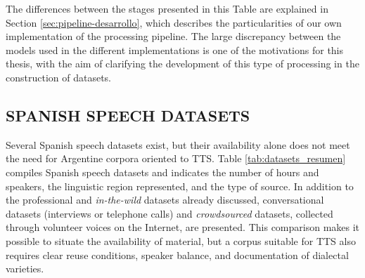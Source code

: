 The differences between the stages presented in this Table are explained in Section \ref{sec:pipeline-desarrollo}, which describes the particularities of our own implementation of the processing pipeline. The large discrepancy between the models used in the different implementations is one of the motivations for this thesis, with the aim of clarifying the development of this type of processing in the construction of datasets.

\subsection{SPANISH SPEECH DATASETS}
Several Spanish speech datasets exist, but their availability alone does not meet the need for Argentine corpora oriented to TTS. Table \ref{tab:datasets_resumen} compiles Spanish speech datasets and indicates the number of hours and speakers, the linguistic region represented, and the type of source. In addition to the professional and \emph{in-the-wild} datasets already discussed, conversational datasets (interviews or telephone calls) and \emph{crowdsourced} datasets, collected through volunteer voices on the Internet, are presented. This comparison makes it possible to situate the availability of material, but a corpus suitable for TTS also requires clear reuse conditions, speaker balance, and documentation of dialectal varieties.

